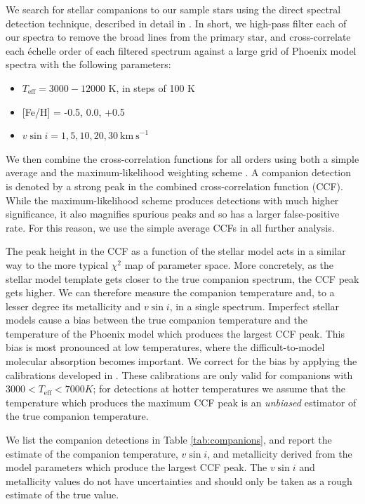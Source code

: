 \documentclass{emulateapj}
\begin{document}
We search for stellar companions to our sample stars using the direct spectral detection technique, described in detail in \citet{Gullikson2016}. In short, we high-pass filter each of our spectra to remove the broad lines from the primary star, and cross-correlate each \'echelle order of each filtered spectrum against a large grid of Phoenix model spectra \citep{Husser2013_b} with the following parameters:

\begin{itemize}
\item $T_\mathrm{eff} = 3000-12000$ K, in steps of 100 K
\item {[}Fe/H{]} = -0.5, 0.0, +0.5
\item $v\sin{i} = 1, 5, 10, 20, 30 \ \mathrm{km\ s}^{-1}$
\end{itemize}

We then combine the cross-correlation functions for all orders using both a simple average and the maximum-likelihood weighting scheme \citep{Zucker2003}. A companion detection is denoted by a strong peak in the combined cross-correlation function (CCF). While the maximum-likelihood scheme produces detections with much higher significance, it also magnifies spurious peaks and so has a larger false-positive rate. For this reason, we use the simple average CCFs in all further analysis.

The peak height in the CCF as a function of the stellar model acts in a similar way to the more typical $\chi^2$ map of parameter space. More concretely, as the stellar model template gets closer to the true companion spectrum, the CCF peak gets higher. We can therefore measure the companion temperature and, to a lesser degree its metallicity and $v\sin{i}$, in a single spectrum. Imperfect stellar models cause a bias between the true companion temperature and the temperature of the Phoenix model which produces the largest CCF peak. This bias is most pronounced at low temperatures, where the difficult-to-model molecular absorption becomes important. We correct for the bias by applying the calibrations developed in \citet{Gullikson2016}. These calibrations are only valid for companions with $3000 < T_\mathrm{eff} < 7000 K$; for detections at hotter temperatures we assume that the temperature which produces the maximum CCF peak is an \emph{unbiased} estimator of the true companion temperature.

We list the companion detections in Table \ref{tab:companions}, and report the estimate of the companion temperature, $v\sin{i}$, and metallicity derived from the model parameters which produce the largest CCF peak. The $v\sin{i}$ and metallicity values do not have uncertainties and should only be taken as a rough estimate of the true value. 
\end{document}
